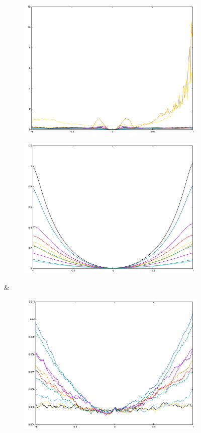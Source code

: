 {\begin{figure}[H]
\begin{subfigure}{.33\textwidth}
	\includegraphics[width=\linewidth]{fig/ajherr/t2/L_chi.pdf}
\end{subfigure}%
\begin{subfigure}{.33\textwidth}
	\includegraphics[width=\linewidth]{fig/ajherr/t2/M_chi.pdf}
\end{subfigure}&
\begin{subfigure}{.33\textwidth}
	\includegraphics[width=\linewidth]{fig/ajherr/t2/S_chi.pdf}

\end{subfigure}
\end{figure}}
